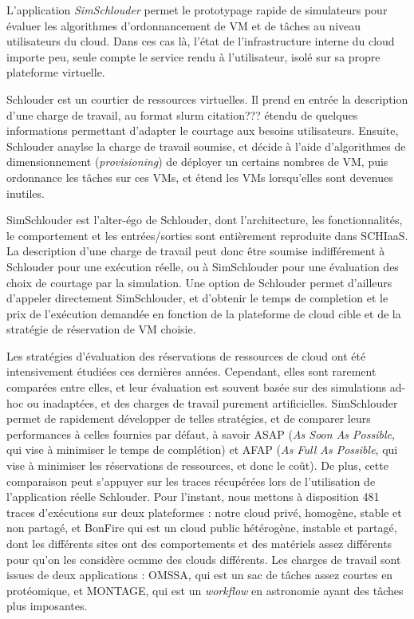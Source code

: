 \documentclass[parallelisme]{compas2017}
\begin{document}
L'application \emph{SimSchlouder} permet le prototypage rapide de simulateurs pour évaluer les 
algorithmes d'ordonnancement de VM et de tâches au niveau utilisateurs du cloud. 
Dans ces cas là, l'état de l'infrastructure interne du cloud importe peu, seule compte le service 
rendu à l'utilisateur, isolé sur sa propre plateforme virtuelle. 

Schlouder\cite{Michon2017} est un courtier de ressources virtuelles. Il prend en
entrée la description d'une charge de travail, au format slurm citation???
étendu de quelques informations permettant d'adapter le courtage aux besoins
utilisateurs. Ensuite, Schlouder anaylse la charge de travail soumise, et décide
à l'aide d'algorithmes de dimensionnement (\textit{provisioning}) de déployer un
certains nombres de VM, puis ordonnance les tâches sur ces VMs, et étend les VMs
lorsqu'elles sont devenues inutiles.

SimSchlouder est l'alter-égo de Schlouder, dont l'architecture, les fonctionnalités, le comportement
et les entrées/sorties sont entièrement reproduite dans SCHIaaS. La description d'une charge de 
travail peut donc être soumise indifférement à Schlouder pour une exécution réelle, ou à SimSchlouder
pour une évaluation des choix de courtage par la simulation. Une option de Schlouder permet 
d'ailleurs d'appeler directement SimSchlouder, et d'obtenir le temps de completion et le prix 
de l'exécution demandée en fonction de la plateforme de cloud cible et de la stratégie de réservation
de VM choisie.

Les stratégies d'évaluation des réservations de ressources de cloud ont été intensivement étudiées 
ces dernières années. Cependant, elles sont rarement comparées entre elles, et leur évaluation 
est souvent basée sur des simulations ad-hoc ou inadaptées, et des charges de travail purement artificielles.
SimSchlouder permet de rapidement développer de telles stratégies, et de comparer leurs performances 
à celles fournies par défaut, à savoir ASAP (\textit{As Soon As Possible}, qui vise à minimiser le temps de 
complétion) et AFAP (\textit{As Full As Possible}, qui vise à minimiser les réservations de ressources,
et donc le coût). De plus, cette comparaison peut s'appuyer sur les traces récupérées lors de l'utilisation 
de l'application réelle Schlouder. Pour l'instant, nous mettons à disposition 481 traces d'exécutions
sur deux plateformes : notre cloud privé, homogène, stable et non partagé, et BonFire qui est un cloud 
public hétérogène, instable et partagé, dont les différents sites ont des comportements et des matériels 
assez différents pour qu'on les considère ocmme des clouds différents.
Les charges de travail sont issues de deux applications : OMSSA, qui est un sac de tâches assez courtes 
en protéomique, et MONTAGE, qui est un \textit{workflow} en astronomie ayant des tâches plus imposantes. 
\end{document}

